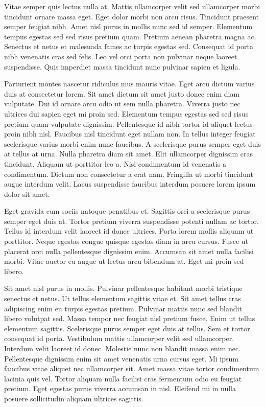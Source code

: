\documentclass[11pt,a4paper]{article}
\begin{document}
Vitae semper quis lectus nulla at. Mattis ullamcorper velit sed ullamcorper morbi tincidunt ornare massa eget. Eget dolor morbi non arcu risus. Tincidunt praesent semper feugiat nibh. Amet nisl purus in mollis nunc sed id semper. Elementum tempus egestas sed sed risus pretium quam. Pretium aenean pharetra magna ac. Senectus et netus et malesuada fames ac turpis egestas sed. Consequat id porta nibh venenatis cras sed felis. Leo vel orci porta non pulvinar neque laoreet suspendisse. Quis imperdiet massa tincidunt nunc pulvinar sapien et ligula.

Parturient montes nascetur ridiculus mus mauris vitae. Eget arcu dictum varius duis at consectetur lorem. Sit amet dictum sit amet justo donec enim diam vulputate. Dui id ornare arcu odio ut sem nulla pharetra. Viverra justo nec ultrices dui sapien eget mi proin sed. Elementum tempus egestas sed sed risus pretium quam vulputate dignissim. Pellentesque id nibh tortor id aliquet lectus proin nibh nisl. Faucibus nisl tincidunt eget nullam non. In tellus integer feugiat scelerisque varius morbi enim nunc faucibus. A scelerisque purus semper eget duis at tellus at urna. Nulla pharetra diam sit amet. Elit ullamcorper dignissim cras tincidunt. Aliquam ut porttitor leo a. Nisl condimentum id venenatis a condimentum. Dictum non consectetur a erat nam. Fringilla ut morbi tincidunt augue interdum velit. Lacus suspendisse faucibus interdum posuere lorem ipsum dolor sit amet.

Eget gravida cum sociis natoque penatibus et. Sagittis orci a scelerisque purus semper eget duis at. Tortor pretium viverra suspendisse potenti nullam ac tortor. Tellus id interdum velit laoreet id donec ultrices. Porta lorem mollis aliquam ut porttitor. Neque egestas congue quisque egestas diam in arcu cursus. Fusce ut placerat orci nulla pellentesque dignissim enim. Accumsan sit amet nulla facilisi morbi. Vitae auctor eu augue ut lectus arcu bibendum at. Eget mi proin sed libero.

Sit amet nisl purus in mollis. Pulvinar pellentesque habitant morbi tristique senectus et netus. Ut tellus elementum sagittis vitae et. Sit amet tellus cras adipiscing enim eu turpis egestas pretium. Pulvinar mattis nunc sed blandit libero volutpat sed. Massa tempor nec feugiat nisl pretium fusce. Enim ut tellus elementum sagittis. Scelerisque purus semper eget duis at tellus. Sem et tortor consequat id porta. Vestibulum mattis ullamcorper velit sed ullamcorper. Interdum velit laoreet id donec. Molestie nunc non blandit massa enim nec. Pellentesque dignissim enim sit amet venenatis urna cursus eget. Mi ipsum faucibus vitae aliquet nec ullamcorper sit. Amet massa vitae tortor condimentum lacinia quis vel. Tortor aliquam nulla facilisi cras fermentum odio eu feugiat pretium. Eget egestas purus viverra accumsan in nisl. Eleifend mi in nulla posuere sollicitudin aliquam ultrices sagittis.
\end{document}
